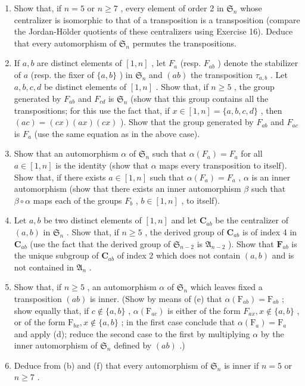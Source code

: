 \begin{enumerate}
\def\labelenumi{(\alph{enumi})}
\setcounter{enumi}{1}
\item
  Show that, if \(n = 5\) or \(n \geqslant 7\) , every element of order 2 in \(\mathfrak{S}_n\) whose centralizer is isomorphic to that of a transposition is a transposition (compare the Jordan-Hölder quotients of these centralizers using Exercise 16). Deduce that every automorphism of \(\mathfrak{S}_n\) permutes the transpositions.
\item
  If \(a, b\) are distinct elements of \([1, n]\) , let \(F_a\) (resp. \(F_{ab}\) ) denote the stabilizer of \(a\) (resp. the fixer of \(\{a, b\}\) ) in \(\mathfrak{S}_n\) and \((ab)\) the transposition \(\tau_{a,b}\) . Let \(a, b, c, d\) be distinct elements of \([1, n]\) . Show that, if \(n \geqslant 5\) , the group generated by \(F_{ab}\) and \(F_{cd}\) is \(\mathfrak{S}_n\) (show that this group contains all the transpositions; for this use the fact that, if \(x \in [1, n] = \{a, b, c, d\}\) , then \((ac) = (cx)(ax)(cx)\) ). Show that the group generated by \(F_{ab}\) and \(F_{ac}\) is \(F_a\) (use the same equation as in the above case).
\item
  Show that an automorphism \(\alpha\) of \(\mathfrak{S}_n\) such that \(\alpha(F_a) = F_a\) for all \(a \in [1, n]\) is the identity (show that \(\alpha\) maps every transposition to itself). Show that, if there exists \(a \in [1, n]\) such that \(\alpha(F_a) = F_a\) , \(\alpha\) is an inner automorphism (show that there exists an inner automorphism \(\beta\) such that \(\beta \circ \alpha\) maps each of the groups \(F_b\) , \(b \in [1, n]\) , to itself).
\item
  Let \(a, b\) be two distinct elements of \([1, n]\) and let \(\mathbf{C}_{ab}\) be the centralizer of \((a, b)\) in \(\mathfrak{S}_n\) . Show that, if \(n \geqslant 5\) , the derived group of \(\mathbf{C}_{ab}\) is of index 4 in \(\mathbf{C}_{ab}\) (use the fact that the derived group of \(\mathfrak{S}_{n-2}\) is \(\mathfrak{A}_{n-2}\) ). Show that \(\mathbf{F}_{ab}\) is the unique subgroup of \(\mathbf{C}_{ab}\) of index 2 which does not contain \((a, b)\) and is not contained in \(\mathfrak{A}_n\) .
\item
  Show that, if \(n \geqslant 5\) , an automorphism \(\alpha\) of \(\mathfrak{S}_n\) which leaves fixed a transposition \((ab)\) is inner. (Show by means of (e) that \(\alpha(\mathrm{F}_{ab}) = \mathrm{F}_{ab}\) ; show equally that, if \(c \notin \{a, b\}\) , \(\alpha(\mathrm{F}_{ac})\) is either of the form \(F_{ax}, x \notin \{a, b\}\) , or of the form \(\mathrm{F}_{bx}, x \notin \{a, b\}\) ; in the first case conclude that \(\alpha(\mathrm{F}_a) = \mathrm{F}_a\) and apply (d); reduce the second case to the first by multiplying \(\alpha\) by the inner automorphism of \(\mathfrak{S}_n\) defined by \((ab)\) .)
\item
  Deduce from (b) and (f) that every automorphism of \(\mathfrak{S}_n\) is inner if \(n = 5\) or \(n \geqslant 7\) .
\end{enumerate}

